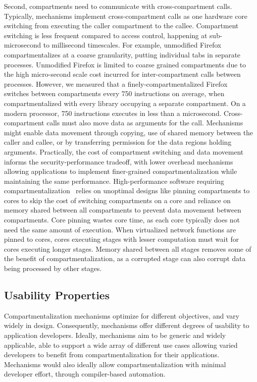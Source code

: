 Second, compartments need to communicate with cross-compartment calls.
Typically, mechanisms implement cross-compartment calls as one hardware
core switching from executing the caller compartment to the callee.
Compartment switching is less frequent compared to access control, happening
at sub-microsecond to millisecond timescales.
For example, unmodified Firefox compartmentalizes at a 
coarse granularity, putting individual tabs in separate processes.
Unmodified Firefox is limited to coarse grained compartments due to the high
micro-second scale cost incurred for inter-compartment calls between
processes.
However, we measured that a finely-compartmentalized Firefox switches between
compartments every 750 instructions on average, 
when compartmentalized with every library occupying a separate compartment.
On a modern processor, 750 instructions executes in less than a microsecond.
Cross-compartment calls must also move data as arguments for the call.
Mechanisms might enable data movement through copying, use of shared memory
between the caller and callee, or by transferring permission for the
data regions holding arguments.
Practically, the cost of compartment switching and data movement informs the 
security-performance tradeoff, 
with lower overhead mechanisms allowing applications to implement
finer-grained compartmentalization while maintaining the same performance.
High-performance software requiring 
compartmentalization~\cite{HwangRW14,MartinsAROHBH14,RamCCR13,HondaHLR15}
relies on unoptimal designs like pinning compartments to cores to skip the
cost of switching compartments on a core and reliance on memory shared between
all compartments to prevent data movement between compartments.
Core pinning wastes core time, as each core typically does not need the same
amount of execution. 
When virtualized network functions are pinned to cores, cores executing stages
with lesser computation must wait for cores executing longer stages.
Memory shared between all stages removes some of the benefit of 
compartmentalization, as a corrupted stage can also corrupt data being 
processed by other stages.

\subsection{Usability Properties}
Compartmentalization mechanisms optimize for different objectives, and vary
widely in design.
Consequently, mechanisms offer different degrees of usability to application
developers.
Ideally, mechanisms aim to be generic and widely applicable, able to support
a wide array of different use cases allowing varied developers to 
benefit from compartmentalization for their applications.
Mechanisms would also ideally allow compartmentalization with minimal developer
effort, through compiler-based automation.

